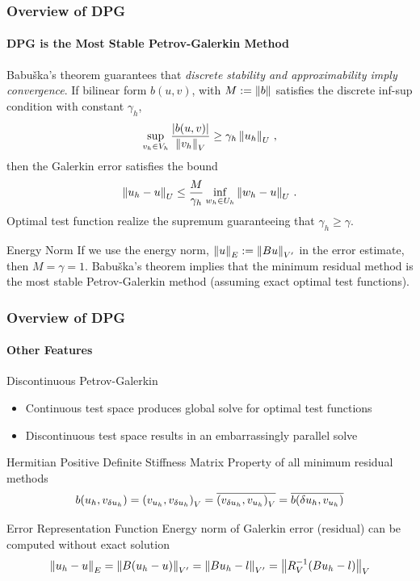 \documentclass[18pt,xcolor=table]{beamer}
\begin{document}
\begin{frame}[t]
\frametitle{Overview of DPG}
\framesubtitle{DPG is the Most Stable Petrov-Galerkin Method}
Babu\v{s}ka's theorem guarantees that \emph{discrete stability and approximability imply convergence}.
If bilinear form $b(u,v)$, with $M:=\left\| b \right\|$ satisfies the discrete inf-sup condition 
with constant $\gamma_h$,
\[
\sup_{v_h\in V_h}\frac{|b(u,v)|}{\left\| v_h \right\|_V}\geq\gamma_h\left\| u_h \right\|_U\,,
\]
then the Galerkin error satisfies the bound
\[
\left\| u_h-u \right\|_U\leq\frac{M}{\gamma_h}\inf_{w_h\in U_h}\left\| w_h-u \right\|_U\,.
\]
Optimal test function realize the supremum guaranteeing that $\gamma_h\geq\gamma$.\\
\begin{block}{Energy Norm}
If we use the energy norm, $\left\| u \right\|_E:=\left\| Bu \right\|_{V'}$ in the error estimate, then $M=\gamma=1$.
Babu\v{s}ka's theorem
implies that the minimum residual method is the most stable Petrov-Galerkin method (assuming exact optimal test functions).
\end{block}
\end{frame}




\begin{frame}[t]
\frametitle{Overview of DPG}
\framesubtitle{Other Features}
\begin{block}{Discontinuous Petrov-Galerkin}
\begin{itemize}
  \item Continuous test space produces global solve for optimal test functions
  \item Discontinuous test space results in an embarrassingly parallel solve
\end{itemize}
\end{block}
\begin{block}{Hermitian Positive Definite Stiffness Matrix}
Property of all minimum residual methods
\[
b(u_h,v_{\delta u_h})=\left( v_{u_h},v_{\delta u_h} \right)_V=\overline{\left( v_{\delta u_h},v_{u_h} \right)_V}=\overline{b(\delta u_h,v_{u_h})}
\]
\end{block}
\begin{block}{Error Representation Function}
Energy norm of Galerkin error (residual) can be computed without exact solution
\[
\left\| u_h-u \right\|_E=\left\| B(u_h-u) \right\|_{V'}=\left\| Bu_h-l \right\|_{V'}=\left\| R_V^{-1}(Bu_h-l) \right\|_V
\]
\end{block}
\end{frame}
\end{document}
